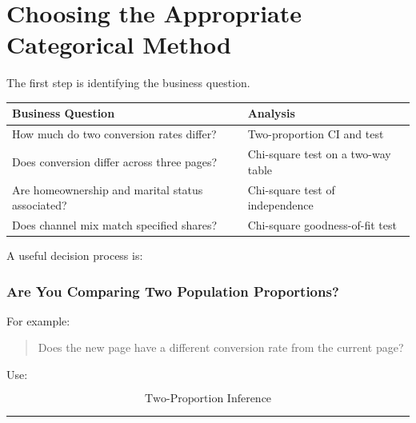 \documentclass[
  letterpaper,
  DIV=11,
  numbers=noendperiod]{scrreprt}
\newcounter{none} %
\begin{document}
\chapter{Choosing the Appropriate Categorical
Method}\label{choosing-the-appropriate-categorical-method}

The first step is identifying the business question.

{\def\LTcaptype{none} %
\begin{longtable}[]{@{}
  >{\raggedright\arraybackslash}p{}
  >{\raggedright\arraybackslash}p{}@{}}
\toprule\noalign{}
\begin{minipage}[b]{\linewidth}\raggedright
Business Question
\end{minipage} & \begin{minipage}[b]{\linewidth}\raggedright
Analysis
\end{minipage} \\
\midrule\noalign{}
\endhead
\bottomrule\noalign{}
\endlastfoot
How much do two conversion rates differ? & Two-proportion CI and test \\
Does conversion differ across three pages? & Chi-square test on a
two-way table \\
Are homeownership and marital status associated? & Chi-square test of
independence \\
Does channel mix match specified shares? & Chi-square goodness-of-fit
test \\
\end{longtable}
}

A useful decision process is:

\subsection{Are You Comparing Two Population
Proportions?}\label{are-you-comparing-two-population-proportions}

For example:

\begin{quote}
Does the new page have a different conversion rate from the current
page?
\end{quote}

Use:

\[
\boxed{\text{Two-Proportion Inference}}
\]

\begin{center}\rule{0.5\linewidth}{0.5pt}\end{center}
\end{document}
